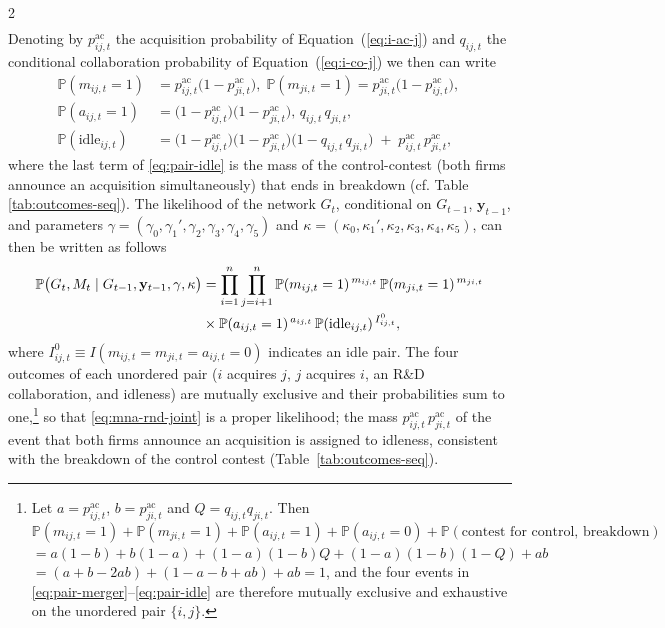 \documentclass[12pt]{article}
\begin{document}
\begin{spacing}{2}
\begin{align}
\label{eq:i-ac-j}
\end{align}
Denoting by $p^{\mathrm{ac}}_{ij,t}$ the acquisition probability of
Equation~(\ref{eq:i-ac-j}) and $q_{ij,t}$ the conditional collaboration probability of Equation~(\ref{eq:i-co-j}) we then can write
\begin{align}
\mathbb{P}(m_{ij,t}=1)
  &= p^{\mathrm{ac}}_{ij,t}\bigl(1-p^{\mathrm{ac}}_{ji,t}\bigr), \; \mathbb{P}(m_{ji,t}=1)
  = p^{\mathrm{ac}}_{ji,t}\bigl(1-p^{\mathrm{ac}}_{ij,t}\bigr),\,
  \label{eq:pair-merger}\\[2pt]
\mathbb{P}(a_{ij,t}=1)
  &= \bigl(1-p^{\mathrm{ac}}_{ij,t}\bigr)\bigl(1-p^{\mathrm{ac}}_{ji,t}\bigr),\,
     q_{ij,t}\,q_{ji,t},
  \label{eq:pair-collab}\\[2pt]
\mathbb{P}(\mathrm{idle}_{ij,t})
  &= \bigl(1-p^{\mathrm{ac}}_{ij,t}\bigr)\bigl(1-p^{\mathrm{ac}}_{ji,t}\bigr)
     \bigl(1-q_{ij,t}\,q_{ji,t}\bigr)
     \;+\; p^{\mathrm{ac}}_{ij,t}\,p^{\mathrm{ac}}_{ji,t},
  \label{eq:pair-idle}
\end{align}
where the last term of \eqref{eq:pair-idle} is the mass of the control-contest (both firms announce an acquisition simultaneously) that ends in breakdown (cf. Table \ref{tab:outcomes-seq}). The likelihood of the network $G_t$, conditional on $G_{t-1}$, $\mathbf{y}_{t-1}$, and parameters $\gamma=(\gamma_0,\gamma_1',\gamma_2,\gamma_3,\gamma_4,\gamma_5)$ and $\kappa=(\kappa_0,\kappa_1',\kappa_2,\kappa_3,\kappa_4,\kappa_5)$, 
can then be written as follows
\begin{align}
\mathbb{P}\bigl(G_t, M_t \mid G_{t-1}, \mathbf{y}_{t-1}, \gamma, \kappa\bigr)
& =
\prod_{i=1}^{n}\prod_{j=i+1}^{n}
  \mathbb{P}(m_{ij,t}=1)^{\,m_{ij,t}}\,
  \mathbb{P}(m_{ji,t}=1)^{\,m_{ji,t}} \notag \\
  & \times \mathbb{P}(a_{ij,t}=1)^{\,a_{ij,t}}\,
  \mathbb{P}(\mathrm{idle}_{ij,t})^{\,I^{0}_{ij,t}},
\label{eq:mna-rnd-joint}
\end{align}
where $I^{0}_{ij,t} \equiv I(m_{ij,t}=m_{ji,t}=a_{ij,t}=0)$ indicates an
idle pair. The four
outcomes of each unordered pair ($i$ acquires $j$, $j$ acquires $i$,
an R\&D collaboration, and idleness) are mutually exclusive and their
probabilities sum to one,\footnote{Let $a=p^{\mathrm{ac}}_{ij,t}$, $b=p^{\mathrm{ac}}_{ji,t}$ and
$Q=q_{ij,t}q_{ji,t}$. Then $\mathbb{P}(m_{ij,t}=1) + \mathbb{P}(m_{ji,t}=1) + \mathbb{P}(a_{ij,t}=1) + \mathbb{P}(a_{ij,t}=0) + \mathbb{P}(\text{contest for control, breakdown}) $ $= a(1-b) + b(1-a) + (1-a)(1-b)Q+(1-a)(1-b)(1-Q) + ab $ $= (a+b-2ab)+(1-a-b+ab)+ab=1$, 
and the four events in \eqref{eq:pair-merger}--\eqref{eq:pair-idle} are therefore
mutually exclusive and exhaustive on the unordered pair $\{i,j\}$.} so that \eqref{eq:mna-rnd-joint} is a proper
likelihood; the mass $p^{\mathrm{ac}}_{ij,t}\,p^{\mathrm{ac}}_{ji,t}$ of
the event that both firms announce an acquisition is assigned to
idleness, consistent with the breakdown of the control contest
(Table~\ref{tab:outcomes-seq}).


\end{spacing}
\end{document}
